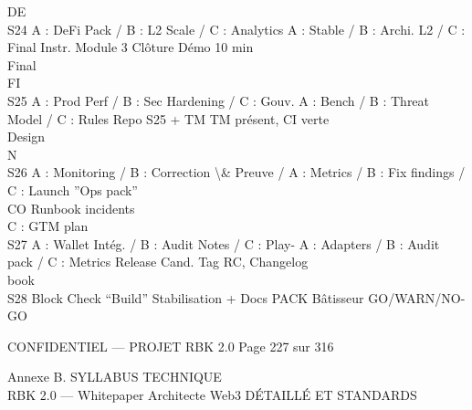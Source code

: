 \vspace{0.5em}
\vspace{0.5em}
\vspace{0.5em}
\vspace{0.5em}
DE\\
S24    A : DeFi Pack / B : L2 Scale / C : Analytics A : Stable / B : Archi. L2 / C : Final Instr. Module 3 Clôture      Démo 10 min\\
Final\\
\vspace{0.5em}
\vspace{0.5em}
\vspace{0.5em}
\vspace{0.5em}
FI\\
S25    A : Prod Perf / B : Sec Hardening / C : Gouv. A : Bench / B : Threat Model / C : Rules      Repo S25 + TM        TM présent, CI verte\\
Design\\
\vspace{0.5em}
\vspace{0.5em}
\vspace{0.5em}
\vspace{0.5em}
N\\
S26    A : Monitoring / B : Correction \textbackslash{}& Preuve / A : Metrics / B : Fix findings / C : Launch ”Ops pack”\\
CO                                                                     Runbook incidents\\
C : GTM                                         plan\\
S27    A : Wallet Intég. / B : Audit Notes / C : Play- A : Adapters / B : Audit pack / C : Metrics Release Cand.        Tag RC, Changelog\\
book\\
S28    Block Check “Build”                             Stabilisation + Docs                        PACK Bâtisseur       GO/WARN/NO-GO\\
\vspace{0.5em}
\vspace{0.5em}
\vspace{0.5em}
\vspace{0.5em}
\begin{confidential}CONFIDENTIEL — PROJET RBK 2.0                                                Page 227 sur 316\end{confidential}
Annexe B. SYLLABUS TECHNIQUE\\
RBK 2.0 — Whitepaper Architecte Web3                                                                                    DÉTAILLÉ ET STANDARDS\\
